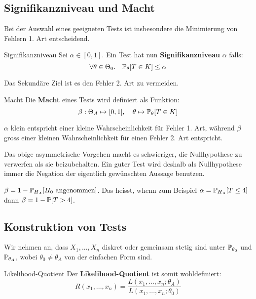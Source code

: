 \subsection{Signifikanzniveau und Macht}

Bei der Auswahl eines geeigneten Tests ist insbesondere die Minimierung von Fehlern 1. Art entscheidend. \smallskip

\begin{mainbox}{Signifikanzniveau}
    Sei $\alpha \in [0,1]$. Ein Test hat nun \textbf{Signifikanzniveau} $\alpha$ falls:
    $$\forall \theta \in \Theta_0. \quad \mathbb{P}_\theta[T \in K] \leq \alpha$$
\end{mainbox}

Das Sekundäre Ziel ist es den Fehler 2. Art zu vermeiden. \smallskip

\begin{mainbox}{Macht}
    Die \textbf{Macht} eines Tests wird definiert als Funktion:
    $$\beta: \Theta_A \mapsto [0,1], \quad \theta \mapsto \mathbb{P}_\theta[T \in K]$$
\end{mainbox}

\Bem $\alpha$ klein entspricht einer kleine Wahrscheinlichkeit für Fehler 1. Art, während $\beta$ gross einer kleinen Wahrscheinlichkeit für einen Fehler 2. Art entspricht. \smallskip

Das obige asymmetrische Vorgehen macht es schwieriger, die Nullhypothese zu verwerfen als sie beizubehalten. Ein guter Test wird deshalb als Nullhypothese immer die Negation der eigentlich gewünschten Aussage benutzen.

\Bem $\beta = 1 - \mathbb{P}_{H_A}[H_0 \text{ angenommen}]$. Das heisst, whenn zum Beispiel $\alpha = \mathbb{P}_{H_A}[T \leq 4]$ dann $\beta = 1 - \mathbb{P}[T > 4]$.




\subsection{Konstruktion von Tests}

Wir nehmen an, dass $X_1,...,X_n$ diskret oder gemeinsam stetig sind unter $\mathbb{P}_{\theta_0}$ und $\mathbb{P}_{\theta_A}$, wobei $\theta_0 \neq \theta_A$ von der einfachen Form sind. \smallskip

\begin{subbox}{Likelihood-Quotient}
Der \textbf{Likelihood-Quotient} ist somit wohldefiniert:
$$R(x_1,...,x_n) = \frac{L(x_1,...,x_n; \theta_A)}{L(x_1,...,x_n; \theta_0)}$$
\end{subbox}

